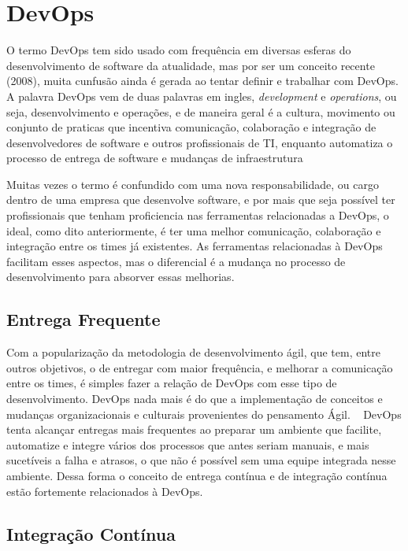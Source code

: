 \section[devops]{DevOps}

O termo DevOps tem sido usado com frequência em diversas esferas do desenvolvimento de software da atualidade, mas por ser um conceito recente (2008), muita cunfusão ainda é gerada ao tentar definir e trabalhar com DevOps. A palavra DevOps vem de duas palavras em ingles, \textit{development} e \textit{operations}, ou seja, desenvolvimento e operações, e de maneira geral é a cultura, movimento ou conjunto de praticas que incentiva comunicação, colaboração e integração de desenvolvedores de software e outros profissionais de TI, enquanto automatiza o processo de entrega de software e mudanças de infraestrutura ~\cite{loukides2012devops}~\cite{erich2014mapping}

Muitas vezes o termo é confundido com uma nova responsabilidade, ou cargo dentro de uma empresa que desenvolve software, e por mais que seja possível ter profissionais que tenham proficiencia nas ferramentas relacionadas a DevOps, o ideal, como dito anteriormente, é ter uma melhor comunicação, colaboração e integração entre os times já existentes. As ferramentas relacionadas à DevOps facilitam esses aspectos, mas o diferencial é a mudança no processo de desenvolvimento para absorver essas melhorias.

\subsection{Entrega Frequente}

Com a popularização da metodologia de desenvolvimento ágil, que tem, entre outros objetivos, o de entregar com maior frequência, e melhorar a comunicação entre os times, é simples fazer a relação de DevOps com esse tipo de desenvolvimento. DevOps nada mais é do que a implementação de conceitos e mudanças organizacionais e culturais provenientes do pensamento Ágil. ~\cite{scott2014} DevOps tenta alcançar entregas mais frequentes ao preparar um ambiente que facilite, automatize e integre vários dos processos que antes seriam manuais, e mais sucetíveis a falha e atrasos, o que não é possível sem uma equipe integrada nesse ambiente. Dessa forma o conceito de entrega contínua e de integração contínua estão fortemente relacionados à DevOps.

\subsection{Integração Contínua}

